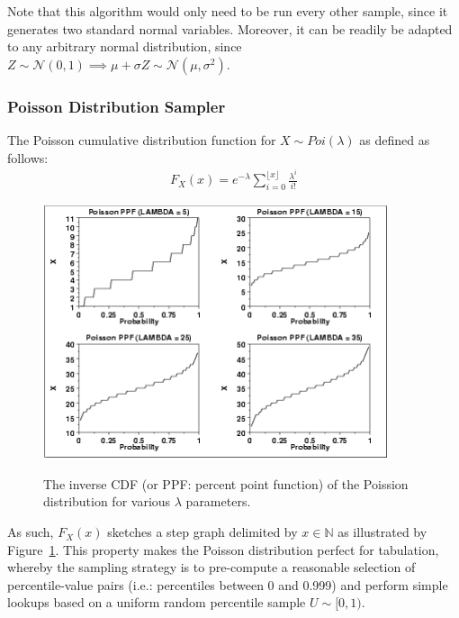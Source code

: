 Note that this algorithm would only need to be run every other sample, since it generates two standard normal
variables. Moreover, it can be readily be adapted to any arbitrary normal distribution, since $Z \sim \mathcal{N}(0,
1) \implies \mu + \sigma Z \sim \mathcal{N}(\mu, \sigma^2)$.

\subsubsection{Poisson Distribution Sampler}\label{subsubsection:poisson_distribution_sampler}

The Poisson cumulative distribution function for $X \sim Poi(\lambda)$ as defined as follows:
\begin{align*}
    F_X(x) = e^{-\lambda} \sum_{i=0}^{\lfloor x \rfloor} \frac{\lambda^i}{i!}
\end{align*}

\begin{figure}[!h]
    \includegraphics[width=0.9\textwidth]{images/chapter_3_design/poisson_percent_point_function}
    \centering~\caption{The inverse CDF (or PPF: percent point function) of the Poission distribution for various
        $\lambda$ parameters\cite{engineering_statistics_handbook_poisson_distribution}.}
    \label{fig:chapter_3_design-poisson_percent_point_function}
\end{figure}

As such, $F_X(x)$ sketches a step graph delimited by $x \in \mathbb{N}$ as illustrated by
Figure~\ref{fig:chapter_3_design-poisson_percent_point_function}. This property makes the Poisson distribution
perfect for tabulation, whereby the sampling strategy is to pre-compute a reasonable selection of percentile-value
pairs (i.e.: percentiles between 0 and 0.999) and perform simple lookups based on a uniform random percentile sample
$U \sim [0, 1)$.

